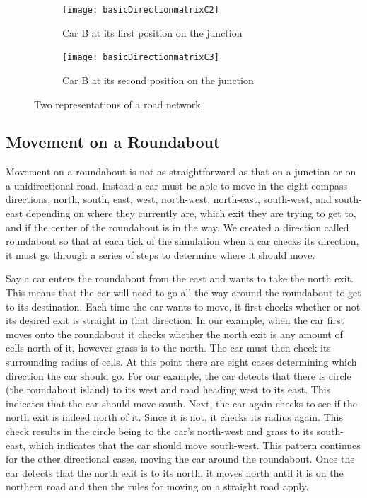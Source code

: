 \documentclass{article}
\begin{document}
	\begin{figure}[H]
		\centering
		
		\begin{subfigure}{0.45\textwidth}
			\centering
			\texttt{[image: basicDirectionmatrixC2]}
			\caption{Car B at its first position on the junction}
			\label{FirstMove}
		\end{subfigure}
		\qquad
		\begin{subfigure}{0.45\textwidth}
			\centering
			\texttt{[image: basicDirectionmatrixC3]}
			\caption{Car B at its second position on the junction}
			\label{SecondMove}
		\end{subfigure}
		\caption{Two representations of a road network}
		\label{Car B in a junction}
	\end{figure}


\subsection{Movement on a Roundabout}\label{movementOnARoundabout}

Movement on a roundabout is not as straightforward as that on a junction or on a unidirectional road. Instead a car must be able to move in the eight compass directions, north, south, east, west, north-west, north-east, south-west, and south-east depending on where they currently are, which exit they are trying to get to, and if the center of the roundabout is in the way. We created a direction called roundabout so that at each tick of the simulation when a car checks its direction, it must go through a series of steps to determine where it should move. 

Say a car enters the roundabout from the east and wants to take the north exit. This means that the car will need to go all the way around the roundabout to get to its destination. 
Each time the car wants to move, it first checks whether or not its desired exit is straight in that direction. In our example, when the car first moves onto the roundabout it checks whether the north exit is any amount of cells north of it, however grass is to the north. The car must then check its surrounding radius of cells. At this point there are eight cases determining which direction the car should go. For our example, the car detects that there is circle (the roundabout island) to its west and road heading west to its east. This indicates that the car should move south. Next, the car again checks to see if the north exit is indeed north of it. Since it is not, it checks its radius again. This check results in the circle being to the car's north-west and grass to its south-east, which indicates that the car should move south-west. This pattern continues for the other directional cases, moving the car around the roundabout. Once the car detects that the north exit is to its north, it moves north until it is on the northern road and then the rules for moving on a straight road apply.
\end{document}
